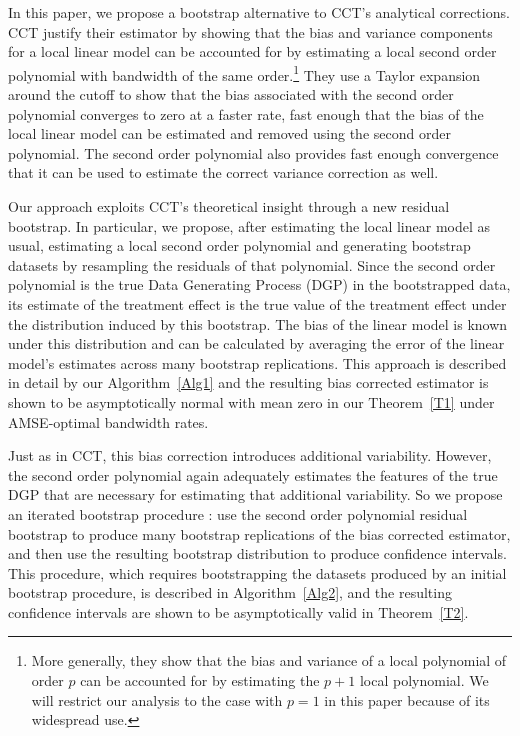 \documentclass[12pt,fleqn]{article}
\begin{document}
In this paper, we propose a bootstrap alternative to CCT's analytical
corrections. CCT justify their estimator by showing that the bias and variance
components for a local linear model can be accounted for by estimating a local
second order polynomial with bandwidth of the same order.\footnote{%
  More generally, they show that the bias and variance of a local polynomial of
  order $p$ can be accounted for by estimating the $p+1$ local polynomial. We
  will restrict our analysis to the case with $p = 1$ in this paper because
  of its widespread use.} %
They use a Taylor expansion around the cutoff to show that the bias associated
with the second order polynomial converges to zero at a faster rate, fast
enough that the bias of the local linear model can be estimated and removed
using the second order polynomial. The second order polynomial also provides
fast enough convergence that it can be used to estimate the correct variance
correction as well.

Our approach exploits CCT's theoretical insight through a new residual
bootstrap. In particular, we propose, after estimating the local linear model as
usual, estimating a local second order polynomial and generating bootstrap
datasets by resampling the residuals of that polynomial. Since the second order
polynomial is the true Data Generating Process (DGP) in the bootstrapped data, its estimate of the
treatment effect is the true value of the treatment effect under the
distribution induced by this bootstrap. The bias of the linear model is known
under this distribution and can be calculated by averaging the error of the
linear model's estimates across many bootstrap replications. This approach is
described in detail by our Algorithm~\ref{Alg1} and the resulting bias corrected
estimator is shown to be asymptotically normal with mean zero in our
Theorem~\ref{T1} under AMSE-optimal bandwidth rates.

Just as in CCT, this bias correction introduces additional variability. However,
the second order polynomial again adequately estimates the features of the true
DGP that are necessary for estimating that additional variability. So we propose
an iterated bootstrap procedure \citep{hall1988}: use the second order
polynomial residual bootstrap to produce many bootstrap replications of the bias
corrected estimator, and then use the resulting bootstrap distribution to
produce confidence intervals. This procedure, which requires bootstrapping the
datasets produced by an initial bootstrap procedure, is described in Algorithm~\ref{Alg2}, and the resulting confidence intervals are shown to be asymptotically valid in Theorem~\ref{T2}.
\end{document}
